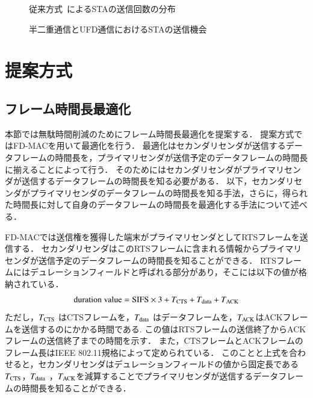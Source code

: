 \documentclass[master]{kuisthesis}		%
\begin{document}
			\begin{figure}[t]
				\centering
				\caption{従来方式~\cite{promac}によるSTAの送信回数の分布}
				\label{fig:numtx}
			\end{figure}

			\begin{figure}[t]
				\centering
				\caption{半二重通信とUFD通信におけるSTAの送信機会}
				\label{fig:problem}
			\end{figure}


\section{提案方式}
	\subsection{フレーム時間長最適化}
		本節では無駄時間削減のためにフレーム時間長最適化を提案する．
		提案方式ではFD-MAC\cite{fdmac}を用いて最適化を行う．
		最適化はセカンダリセンダが送信するデータフレームの時間長を，プライマリセンダが送信予定のデータフレームの時間長に揃えることによって行う．
		そのためにはセカンダリセンダがプライマリセンダが送信するデータフレームの時間長を知る必要がある．
		以下，セカンダリセンダがプライマリセンダのデータフレームの時間長を知る手法，さらに，得られた時間長に対して自身のデータフレームの時間長を最適化する手法について述べる．
		\par
		FD-MACでは送信権を獲得した端末がプライマリセンダとしてRTSフレームを送信する．
		セカンダリセンダはこのRTSフレームに含まれる情報からプライマリセンダが送信予定のデータフレームの時間長を知ることができる．
		RTSフレームにはデュレーションフィールドと呼ばれる部分があり，そこには以下の値が格納されている．
		\begin{equation}
			{\rm duration\ value} = {\rm SIFS} \times 3 + T_{{\rm CTS}} + T_{{\rm data}} + T_{{\rm ACK}}
		\end{equation}
		ただし，$T_{\rm CTS}$ はCTSフレームを，$T_{\rm data}$ はデータフレームを，$T_{\rm ACK}$はACKフレームを送信するのにかかる時間である.
		この値はRTSフレームの送信終了からACKフレームの送信終了までの時間を示す．
		また，CTSフレームとACKフレームのフレーム長はIEEE 802.11規格によって定められている．
		このことと上式を合わせると，セカンダリセンダはデュレーションフィールドの値から固定長である$T_{\rm CTS}$，$T_{\rm data}$ ，$T_{\rm ACK}$を減算することでプライマリセンダが送信するデータフレームの時間長を知ることができる．
		\par
\end{document}
